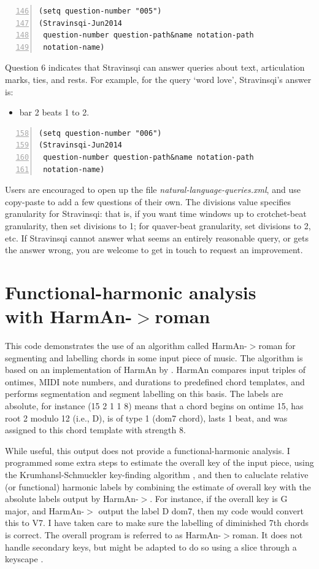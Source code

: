 \begin{Verbatim}[frame=single,numbers=left,firstnumber=146]
(setq question-number "005")
(Stravinsqi-Jun2014
 question-number question-path&name notation-path
 notation-name)
\end{Verbatim}

Question 6 indicates that Stravinsqi can answer
queries about text, articulation marks, ties, and
rests. For example, for the query `word love',
Stravinsqi's answer is:
\begin{itemize}
\item bar 2 beats 1 to 2.
\end{itemize}

\begin{Verbatim}[frame=single,numbers=left,firstnumber=158]
(setq question-number "006")
(Stravinsqi-Jun2014
 question-number question-path&name notation-path
 notation-name)
\end{Verbatim}

Users are encouraged to open up the file
\emph{natural-language-queries.xml}, and use
copy-paste to add a few questions of their own. The
divisions value specifies granularity for Stravinsqi:
that is, if you want time windows up to crotchet-beat
granularity, then set divisions to 1; for quaver-beat
granularity, set divisions to 2, etc. If Stravinsqi
cannot answer what seems an entirely reasonable query,
or gets the answer wrong, you are welcome to get in
touch to request an improvement.


\section[Functional-harmonic analysis with HarmAn-$>$roman]{Functional-harmonic analysis\\ with HarmAn-$>$roman}\label{sec:func-harm-anal}

This code demonstrates the use of an algorithm called
HarmAn-$>$roman for segmenting and labelling chords
in some input piece of music. The algorithm is based
on an implementation of HarmAn by \cite{pardo2002}.
HarmAn compares input triples of ontimes, MIDI note
numbers, and durations to predefined chord templates,
and performs segmentation and segment labelling on
this basis. The labels are absolute, for instance
(15 2 1 1 8) means that a chord begins on ontime 15,
has root 2 modulo 12 (i.e., D), is of type 1 (dom7
chord), lasts 1 beat, and was assigned to this chord
template with strength 8.

While useful, this output does not provide a
functional-harmonic analysis. I programmed some
extra steps to estimate the overall key of the input
piece, using the Krumhansl-Schmuckler key-finding
algorithm \citep{krumhansl1990}, and then to
caluclate relative (or functional) harmonic labels
by combining the estimate of overall key with the
absolute labels output by HarmAn-$>$. For instance,
if the overall key is G major, and HarmAn-$>$ output
the label D dom7, then my code would convert this to
V7. I have taken care to make sure the labelling of
diminished 7th chords is correct. The overall
program is referred to as HarmAn-$>$roman. It does
not handle secondary keys, but might be adapted to
do so using a slice through a keyscape
\citep{sapp2005}.

